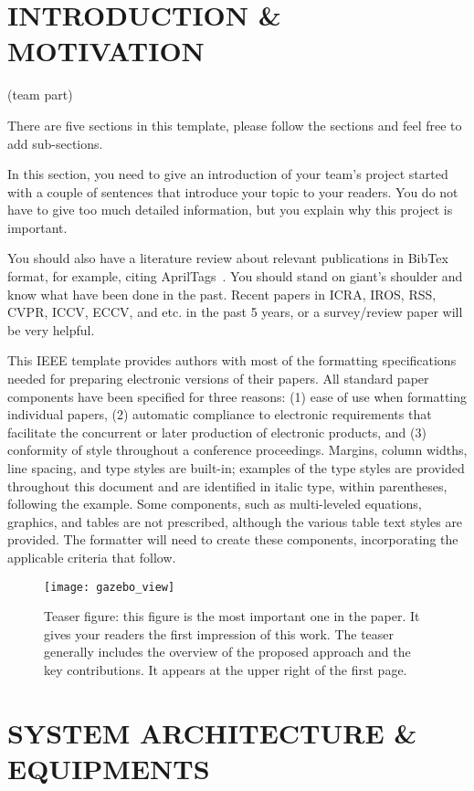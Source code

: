 
\section{INTRODUCTION \& MOTIVATION}

(team part)

There are five sections in this template, please follow the sections and feel free to add sub-sections. 

In this section, you need to give an introduction of your team's project started with a couple of sentences that introduce your topic to your readers. You do not have to give too much detailed information, but you explain why this project is important.

You should also have a literature review about relevant publications in BibTex format, for example, citing AprilTags~\cite{Olson09icra}. You should stand on giant's shoulder and know what have been done in the past. Recent papers in ICRA, IROS, RSS, CVPR, ICCV, ECCV, and etc. in the past 5 years, or a survey/review paper will be very helpful.

This IEEE template provides authors with most of the formatting specifications needed for preparing electronic versions of their papers. All standard paper components have been specified for three reasons: (1) ease of use when formatting individual papers, (2) automatic compliance to electronic requirements that facilitate the concurrent or later production of electronic products, and (3) conformity of style throughout a conference proceedings. Margins, column widths, line spacing, and type styles are built-in; examples of the type styles are provided throughout this document and are identified in italic type, within parentheses, following the example. Some components, such as multi-leveled equations, graphics, and tables are not prescribed, although the various table text styles are provided. The formatter will need to create these components, incorporating the applicable criteria that follow.

\begin{figure}[t]
\texttt{[image: gazebo\_view]}
\centering
\caption{Teaser figure: this figure is the most important one in the paper. It gives your readers the first impression of this work. The teaser generally includes the overview of the proposed approach and the key contributions. It appears at the upper right of the first page.}
\end{figure}

\section{SYSTEM ARCHITECTURE \& EQUIPMENTS}


